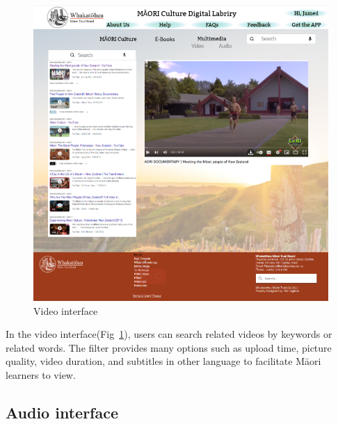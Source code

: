 \begin{figure}[htbp]
  \centerline{\includegraphics[width=400pt]{images/3-3-1.png}}
  \caption{Video interface}
  \label{fig35}
\end{figure}

In the video interface(Fig~\ref{fig35}), users can search related videos by keywords or related words. The filter provides many options such as upload time, picture quality, video duration, and subtitles in other language to facilitate Māori learners to view.

\subsection{Audio interface}

